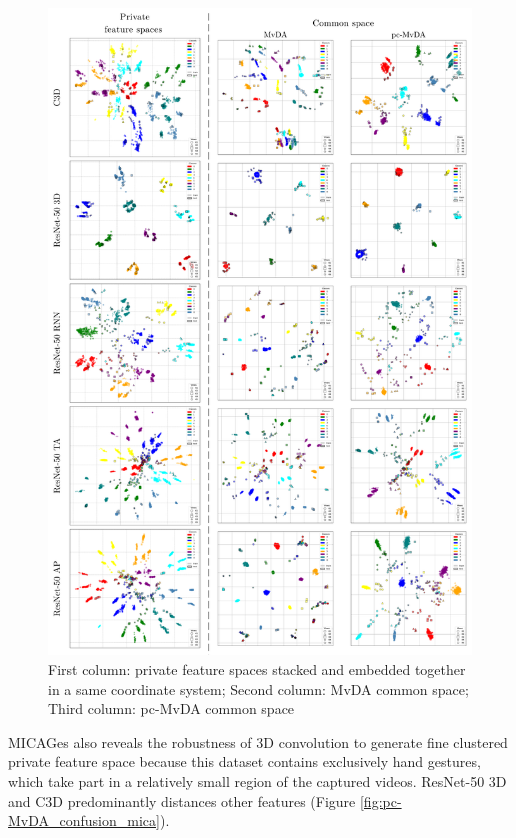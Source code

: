     \begin{figure}[htbp]
        \centering
        \includegraphics[width=1\linewidth, height=0.6\pdfpageheight, keepaspectratio=false]{figs/mica-tsne.png}
        \caption{First column: private feature spaces stacked and embedded together in a same coordinate system; Second column: MvDA common space; Third column: pc-MvDA common space}
        \label{fig:mica-tsne}
    \end{figure}

    MICAGes also reveals the robustness of 3D convolution to generate fine clustered private feature space because this dataset contains exclusively hand gestures, which take part in a relatively small region of the captured videos. ResNet-50 3D and C3D predominantly distances other features (Figure \ref{fig:pc-MvDA_confusion_mica}).

